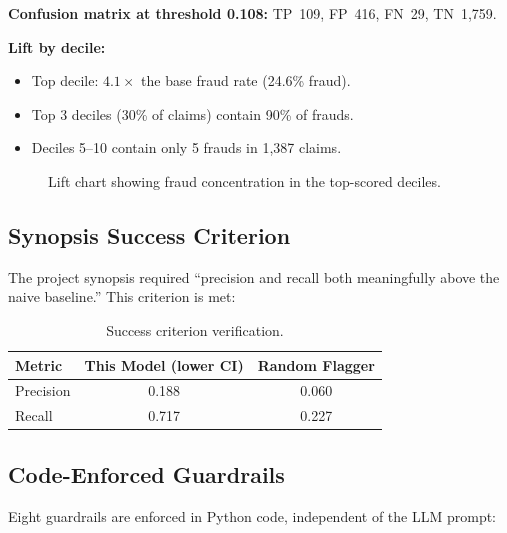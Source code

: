 \documentclass[12pt,a4paper]{article}
\begin{document}
\textbf{Confusion matrix at threshold 0.108:} TP~109, FP~416, FN~29, TN~1,759.

\textbf{Lift by decile:}
\begin{itemize}
    \item Top decile: $4.1\times$ the base fraud rate (24.6\% fraud).
    \item Top 3 deciles (30\% of claims) contain 90\% of frauds.
    \item Deciles 5--10 contain only 5 frauds in 1,387 claims.
\end{itemize}

\begin{figure}[H]
\centering
{}
\caption{Lift chart showing fraud concentration in the top-scored deciles.}
\label{fig:lift}
\end{figure}

\subsection{Synopsis Success Criterion}

The project synopsis required ``precision and recall both meaningfully above the naive baseline.''  This criterion is met:

\begin{table}[H]
\centering
\caption{Success criterion verification.}
\label{tab:success}
\begin{tabular}{@{}lcc@{}}
\toprule
\textbf{Metric} & \textbf{This Model (lower CI)} & \textbf{Random Flagger} \\
\midrule
Precision & 0.188 & 0.060 \\
Recall    & 0.717 & 0.227 \\
\bottomrule
\end{tabular}
\end{table}

\subsection{Code-Enforced Guardrails}

Eight guardrails are enforced in Python code, independent of the LLM prompt:
\end{document}
